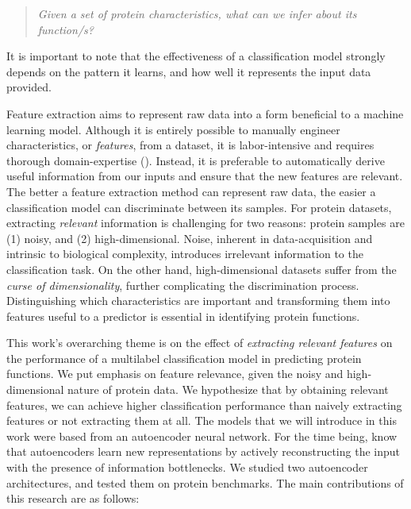 \begin{quote}
    \itshape
    \small
    Given a set of protein characteristics, what can we infer about
    its function/s?
\end{quote}

\noindent It is important to note that the effectiveness of a classification
model strongly depends on the pattern it learns, and how well it represents
the input data provided.

\par Feature extraction aims to represent raw data into a form beneficial to
a machine learning model. Although it is entirely possible to manually
engineer characteristics, or \textit{features}, from a dataset, it is
labor-intensive and requires thorough domain-expertise
(\cite{bengio2013representation}). Instead, it is preferable to automatically
derive useful information from our inputs and ensure that the new features
are relevant. The better a feature extraction method can represent raw data,
the easier a classification model can discriminate between its samples. For
protein datasets, extracting \textit{relevant} information is challenging for
two reasons: protein samples are (1) noisy, and (2) high-dimensional. Noise,
inherent in data-acquisition and intrinsic to biological complexity,
introduces irrelevant information to the classification task. On the other
hand, high-dimensional datasets suffer from the \textit{curse of
dimensionality}, further complicating the discrimination process.
Distinguishing which characteristics are important and transforming them into
features useful to a predictor is essential in identifying protein functions.

\newpage

\par This work's overarching theme is on the effect of \textit{extracting
relevant features} on the performance of a multilabel classification model in
predicting protein functions. We put emphasis on feature relevance, given the
noisy and high-dimensional nature of protein data. We hypothesize that by
obtaining relevant features, we can achieve higher classification performance
than naively extracting features or not extracting them at all. The models
that we will introduce in this work were based from an autoencoder neural
network. For the time being, know that autoencoders learn new representations
by actively reconstructing the input with the presence of information
bottlenecks. We studied two autoencoder architectures, and tested them on
protein benchmarks. The main contributions of this research are as follows:

